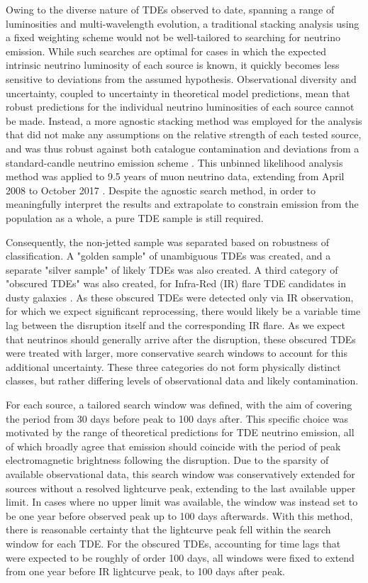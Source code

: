 \documentclass{PoS}
\begin{document}
Owing to the diverse nature of TDEs observed to date, spanning a range of luminosities and multi-wavelength evolution, a traditional stacking analysis using a fixed weighting scheme would not be well-tailored to searching for neutrino emission. While such searches are optimal for cases in which the expected intrinsic neutrino luminosity of each source is known, it quickly becomes less sensitive to deviations from the assumed hypothesis. Observational diversity and uncertainty, coupled to uncertainty in theoretical model predictions, mean that robust predictions for the individual neutrino luminosities of each source cannot be made. Instead, a more agnostic stacking method was employed for the analysis that did not make any assumptions on the relative strength of each tested source, and was thus robust against both catalogue contamination and deviations from a standard-candle neutrino emission scheme \cite{Stasik2018Search}. This unbinned likelihood analysis method was applied to 9.5 years of muon neutrino data, extending from April 2008 to October 2017 \cite{IceCube:2018cha}. Despite the agnostic search method, in order to meaningfully interpret the results and extrapolate to constrain emission from the population as a whole, a pure TDE sample is still required. 

Consequently, the non-jetted sample was separated based on robustness of classification. A "golden sample" of unambiguous TDEs was created, and a separate "silver sample" of likely TDEs was also created. A third category of "obscured TDEs" was also created, for Infra-Red (IR) flare TDE candidates in dusty galaxies \cite{Wang:2018mxl}. As these obscured TDEs were detected only via IR observation, for which we expect significant reprocessing, there would likely be a variable time lag between the disruption itself and the corresponding IR flare. As we expect that neutrinos should generally arrive after the disruption, these obscured TDEs were treated with larger, more conservative search windows to account for this additional uncertainty. These three categories do not form physically distinct classes, but rather differing levels of observational data and likely contamination.

For each source, a tailored search window was defined, with the aim of covering the period from 30 days before peak to 100 days after. This specific choice was motivated by the range of theoretical predictions for TDE neutrino emission, all of which broadly agree that emission should coincide with the period of peak electromagnetic brightness following the disruption. Due to the sparsity of available observational data, this search window was conservatively extended for sources without a resolved lightcurve peak, extending to the last available upper limit. In cases where no upper limit was available, the window was instead set to be one year before observed peak up to 100 days afterwards. With this method, there is reasonable certainty that the lightcurve peak fell within the search window for each TDE. For the obscured TDEs, accounting for time lags that were expected to be roughly of order 100 days, all windows were fixed to extend from one year before IR lightcurve peak, to 100 days after peak.
\end{document}
